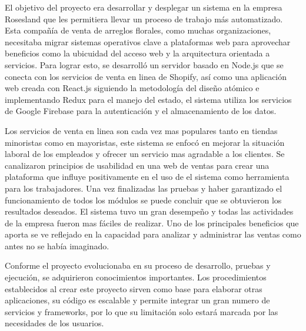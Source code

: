 El objetivo del proyecto era desarrollar y desplegar un sistema en la empresa Rosesland que les permitiera llevar un proceso de trabajo más automatizado. Esta compañía de venta de arreglos florales, como muchas organizaciones, necesitaba migrar sistemas operativos clave a plataformas web para aprovechar beneficios como la ubicuidad del acceso web y la arquitectura orientada a servicios. Para lograr esto, se desarrolló un servidor basado en Node.js que se conecta con los servicios de venta en linea de Shopify, así como una aplicación web creada con React.js siguiendo la metodología del diseño atómico e implementando Redux para el manejo del estado, el sistema utiliza los servicios de Google Firebase para la autenticación y el almacenamiento de los datos.
\vspace{0.8cm}

Los servicios de venta en linea son cada vez mas populares tanto en tiendas minoristas como en mayoristas,  este sistema se enfocó en mejorar la situación laboral de los empleados y ofrecer un servicio mas agradable a los clientes. Se canalizaron principios de usabilidad en una web de ventas para crear una plataforma que influye positivamente en el uso de el sistema como herramienta para los trabajadores. Una vez finalizadas las pruebas y haber garantizado el funcionamiento de todos los módulos se puede concluir que se obtuvieron los resultados deseados. El sistema tuvo un gran desempeño y todas las actividades de la empresa fueron mas fáciles de realizar. Uno de los principales beneficios que aporta se ve reflejado en la capacidad para analizar y administrar las ventas como antes no se había imaginado.
\vspace{0.8cm}

Conforme el proyecto evolucionaba en su proceso de desarrollo, pruebas y ejecución, se adquirieron conocimientos importantes. Los procedimientos establecidos al crear este proyecto sirven como base para elaborar otras aplicaciones, su código es escalable y permite integrar un gran numero de servicios y \glspl{framework}, por lo que su limitación solo estará marcada por las necesidades de los usuarios.
\vspace{0.8cm}

